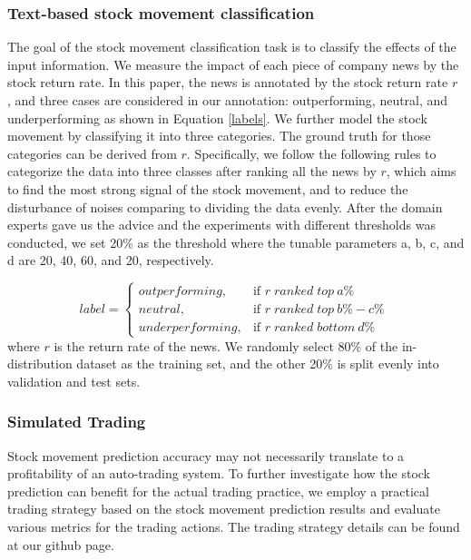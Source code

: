 \documentclass{article}
\begin{document}
\subsubsection{Text-based stock movement classification} 


The goal of the stock movement classification task is to classify the effects of the input information. We measure the impact of each piece of company news by the stock return rate. 
 In this paper, the news is annotated by the stock return rate $r$ , and three cases are considered in our annotation: outperforming, neutral, and underperforming as shown in Equation \ref{labels}. We further model the stock movement by classifying it into three categories. The ground truth for those categories can be derived from $r$. Specifically, we follow the following rules to categorize the data into three classes after ranking all the news by $r$, which aims to find the most strong signal of the stock movement, and to reduce the disturbance of noises comparing to dividing the data evenly. After the domain experts gave us the advice and the experiments with different thresholds was conducted, we set 20\% as the threshold where the tunable parameters a, b, c, and d are 20, 40, 60, and 20, respectively.
 
\begin{equation}
label= 
\begin{cases}
      outperforming,      &\text{if } r \; ranked \; top\ a\%\   \\
    neutral,      &\text{if } r  \; ranked\; top\ b\%-c\%\ \\
    underperforming,      &\text{if } r  \;ranked\;  bottom\ d\%\ 
\end{cases}
\label{labels}
\end{equation}
where $r$ is the return rate of the news. We randomly select 80\% of the in-distribution dataset as the training set, and the other 20\% is split evenly into validation and test sets. 






\subsubsection{Simulated Trading}
Stock movement prediction accuracy may not necessarily translate to a profitability of an auto-trading system. To further investigate how the stock prediction can benefit for the actual trading practice, we employ a practical trading strategy based on the stock movement prediction results and evaluate various metrics for the trading actions. The trading strategy details can be found at our github page.
\end{document}
